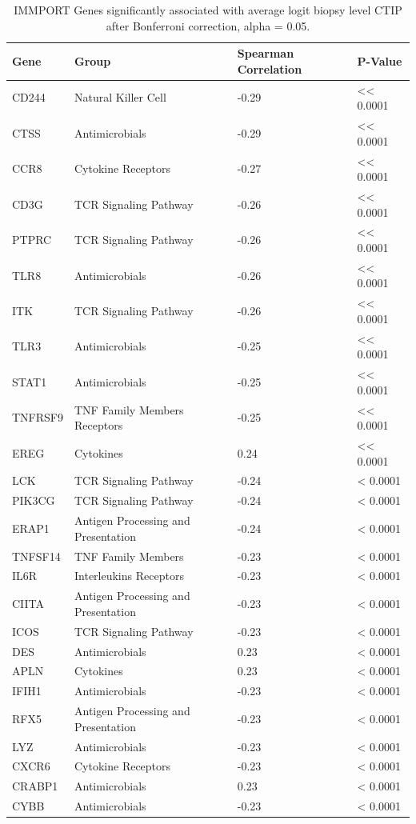 \documentclass[
]{book}
\begin{document}
\begin{table}

\caption{\label{tab:unnamed-chunk-6}IMMPORT Genes significantly associated with average logit biopsy level CTIP after Bonferroni correction, alpha = 0.05.}
\centering
\begin{tabular}[t]{l|l|l|l}
\hline
Gene & Group & Spearman Correlation & P-Value\\
\hline
CD244 & Natural Killer Cell & -0.29 & << 0.0001\\
\hline
CTSS & Antimicrobials & -0.29 & << 0.0001\\
\hline
CCR8 & Cytokine Receptors & -0.27 & << 0.0001\\
\hline
CD3G & TCR Signaling Pathway & -0.26 & << 0.0001\\
\hline
PTPRC & TCR Signaling Pathway & -0.26 & << 0.0001\\
\hline
TLR8 & Antimicrobials & -0.26 & << 0.0001\\
\hline
ITK & TCR Signaling Pathway & -0.26 & << 0.0001\\
\hline
TLR3 & Antimicrobials & -0.25 & << 0.0001\\
\hline
STAT1 & Antimicrobials & -0.25 & << 0.0001\\
\hline
TNFRSF9 & TNF Family Members Receptors & -0.25 & << 0.0001\\
\hline
EREG & Cytokines & 0.24 & << 0.0001\\
\hline
LCK & TCR Signaling Pathway & -0.24 & < 0.0001\\
\hline
PIK3CG & TCR Signaling Pathway & -0.24 & < 0.0001\\
\hline
ERAP1 & Antigen Processing and Presentation & -0.24 & < 0.0001\\
\hline
TNFSF14 & TNF Family Members & -0.23 & < 0.0001\\
\hline
IL6R & Interleukins Receptors & -0.23 & < 0.0001\\
\hline
CIITA & Antigen Processing and Presentation & -0.23 & < 0.0001\\
\hline
ICOS & TCR Signaling Pathway & -0.23 & < 0.0001\\
\hline
DES & Antimicrobials & 0.23 & < 0.0001\\
\hline
APLN & Cytokines & 0.23 & < 0.0001\\
\hline
IFIH1 & Antimicrobials & -0.23 & < 0.0001\\
\hline
RFX5 & Antigen Processing and Presentation & -0.23 & < 0.0001\\
\hline
LYZ & Antimicrobials & -0.23 & < 0.0001\\
\hline
CXCR6 & Cytokine Receptors & -0.23 & < 0.0001\\
\hline
CRABP1 & Antimicrobials & 0.23 & < 0.0001\\
\hline
CYBB & Antimicrobials & -0.23 & < 0.0001\\
\hline
\end{tabular}
\end{table}
\end{document}
